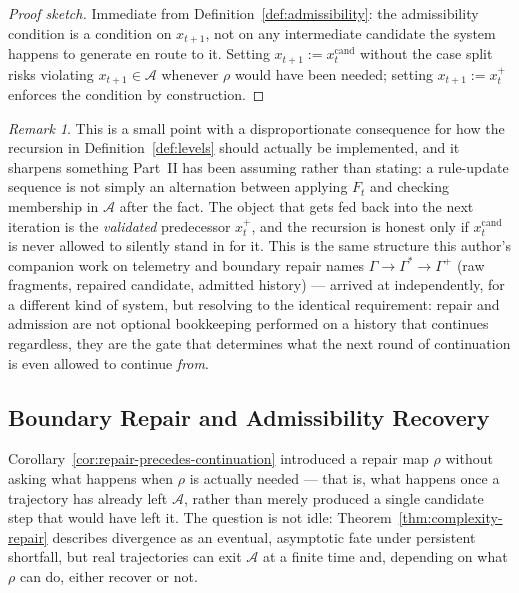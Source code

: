 \documentclass[11pt,a4paper]{article}
\theoremstyle{plain}
\theoremstyle{definition}
\theoremstyle{remark}
\newtheorem{remark}[theorem]{Remark}
\newcommand{\Adm}{\mathcal{A}}
\begin{document}
\begin{proof}[Proof sketch]
Immediate from Definition~\ref{def:admissibility}: the admissibility condition is a condition on $x_{t+1}$, not on any intermediate candidate the system happens to generate en route to it. Setting $x_{t+1} := x_t^{\mathrm{cand}}$ without the case split risks violating $x_{t+1}\in\Adm$ whenever $\rho$ would have been needed; setting $x_{t+1} := x_t^{+}$ enforces the condition by construction.
\end{proof}

\begin{remark}
This is a small point with a disproportionate consequence for how the recursion in Definition~\ref{def:levels} should actually be implemented, and it sharpens something Part~II has been assuming rather than stating: a rule-update sequence is not simply an alternation between applying $F_t$ and checking membership in $\Adm$ after the fact. The object that gets fed back into the next iteration is the \emph{validated} predecessor $x_t^+$, and the recursion is honest only if $x_t^{\mathrm{cand}}$ is never allowed to silently stand in for it. This is the same structure this author's companion work on telemetry and boundary repair names $\Gamma \to \Gamma^* \to \Gamma^+$ (raw fragments, repaired candidate, admitted history) — arrived at independently, for a different kind of system, but resolving to the identical requirement: repair and admission are not optional bookkeeping performed on a history that continues regardless, they are the gate that determines what the next round of continuation is even allowed to continue \emph{from}.
\end{remark}

\subsection{Boundary Repair and Admissibility Recovery}
\label{subsec:admissibility-recovery}

Corollary~\ref{cor:repair-precedes-continuation} introduced a repair map $\rho$ without asking what happens when $\rho$ is actually needed — that is, what happens once a trajectory has already left $\Adm$, rather than merely produced a single candidate step that would have left it. The question is not idle: Theorem~\ref{thm:complexity-repair} describes divergence as an eventual, asymptotic fate under persistent shortfall, but real trajectories can exit $\Adm$ at a finite time and, depending on what $\rho$ can do, either recover or not.
\end{document}
